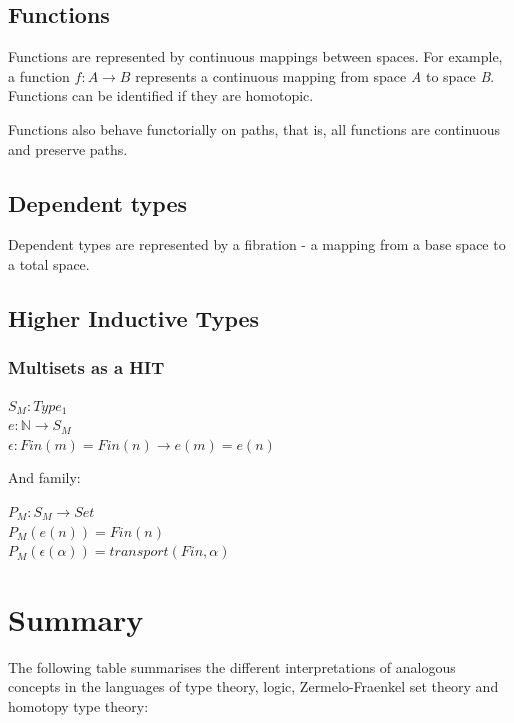 \documentclass[12pt]{report}
\begin{document}
\subsection{Functions}
Functions are represented by continuous mappings between spaces. For example, a function $f : A \rightarrow B$ represents a continuous mapping from space \textit{A} to space \textit{B}. Functions can be identified if they are homotopic.

Functions also behave functorially on paths, that is, all functions are continuous and preserve paths.


\subsection{Dependent types}
Dependent types are represented by a fibration - a mapping from a base space to a total space.

\subsection{Higher Inductive Types}
\subsubsection{Multisets as a HIT}
\begin{center}
$S_M : Type_1$\\
$e : \mathbb{N} \to S_M$\\
$\epsilon : Fin(m) = Fin(n) \to e(m) = e(n) $\\
\end{center}
And family:
\begin{center}
$P_M : S_M \to Set$\\
$P_M(e(n)) = Fin(n)$\\
$P_M(\epsilon(\alpha)) = transport(Fin, \alpha)$\\
\end{center}




\section{Summary}

The following table summarises the different interpretations of analogous concepts in the languages of type theory, logic, Zermelo-Fraenkel set theory and homotopy type theory:
\end{document}
